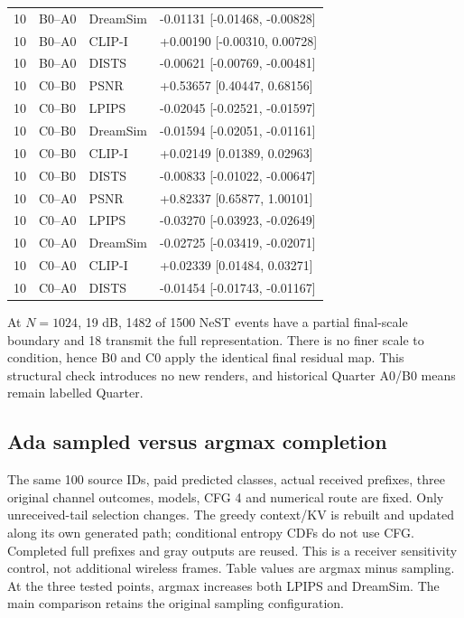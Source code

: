 \documentclass[10pt,letterpaper]{article}
\begin{document}
\begin{longtable}{@{}rlll@{}}
10 & B0--A0 & DreamSim & -0.01131 [-0.01468, -0.00828]\\
10 & B0--A0 & CLIP-I & +0.00190 [-0.00310, 0.00728]\\
10 & B0--A0 & DISTS & -0.00621 [-0.00769, -0.00481]\\
10 & C0--B0 & PSNR & +0.53657 [0.40447, 0.68156]\\
10 & C0--B0 & LPIPS & -0.02045 [-0.02521, -0.01597]\\
10 & C0--B0 & DreamSim & -0.01594 [-0.02051, -0.01161]\\
10 & C0--B0 & CLIP-I & +0.02149 [0.01389, 0.02963]\\
10 & C0--B0 & DISTS & -0.00833 [-0.01022, -0.00647]\\
10 & C0--A0 & PSNR & +0.82337 [0.65877, 1.00101]\\
10 & C0--A0 & LPIPS & -0.03270 [-0.03923, -0.02649]\\
10 & C0--A0 & DreamSim & -0.02725 [-0.03419, -0.02071]\\
10 & C0--A0 & CLIP-I & +0.02339 [0.01484, 0.03271]\\
10 & C0--A0 & DISTS & -0.01454 [-0.01743, -0.01167]\\
\bottomrule\end{longtable}

At $N=1024$, 19 dB, 1482 of 1500 NeST events have a partial final-scale boundary and 18 transmit the full representation. There is no finer scale to condition, hence B0 and C0 apply the identical final residual map. This structural check introduces no new renders, and historical Quarter A0/B0 means remain labelled Quarter.

\subsection{Ada sampled versus argmax completion}
The same 100 source IDs, paid predicted classes, actual received prefixes, three original channel outcomes, models, CFG 4 and numerical route are fixed. Only unreceived-tail selection changes. The greedy context/KV is rebuilt and updated along its own generated path; conditional entropy CDFs do not use CFG. Completed full prefixes and gray outputs are reused. This is a receiver sensitivity control, not additional wireless frames. Table values are argmax minus sampling. At the three tested points, argmax increases both LPIPS and DreamSim. The main comparison retains the original sampling configuration.
\end{document}
